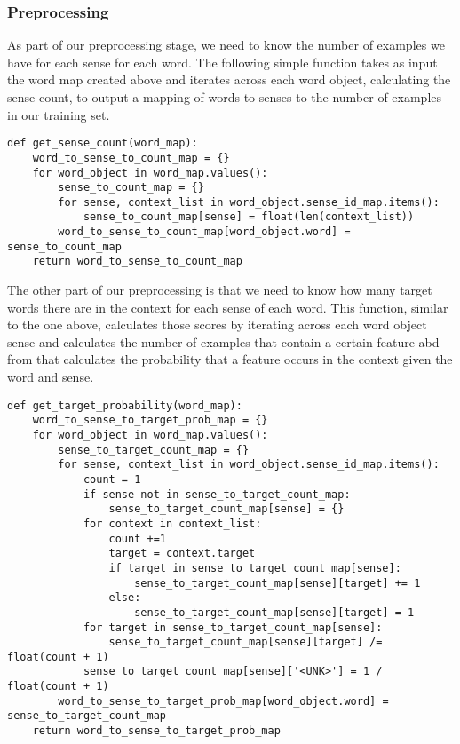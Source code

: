 \documentclass[11pt]{article}
\begin{document}
\subsubsection{Preprocessing}
As part of our preprocessing stage, we need to know the number of examples we have for each sense for each word. The following simple function takes as input the word map created above and iterates across each word object, calculating the sense count, to output a mapping of words to senses to the number of examples in our training set.

\begin{lstlisting}
def get_sense_count(word_map):
    word_to_sense_to_count_map = {}
    for word_object in word_map.values():
        sense_to_count_map = {}
        for sense, context_list in word_object.sense_id_map.items():
            sense_to_count_map[sense] = float(len(context_list))
        word_to_sense_to_count_map[word_object.word] = sense_to_count_map
    return word_to_sense_to_count_map
\end{lstlisting}

The other part of our preprocessing is that we need to know how many target words there are in the context for each sense of each word. This function, similar to the one above, calculates those scores by iterating across each word object sense and calculates the number of examples that contain a certain feature abd from that calculates the probability that a feature occurs in the context given the word and sense.

\begin{lstlisting}
def get_target_probability(word_map):
    word_to_sense_to_target_prob_map = {}
    for word_object in word_map.values():
        sense_to_target_count_map = {}
        for sense, context_list in word_object.sense_id_map.items():
            count = 1
            if sense not in sense_to_target_count_map:
                sense_to_target_count_map[sense] = {}
            for context in context_list:
                count +=1
                target = context.target
                if target in sense_to_target_count_map[sense]:
                    sense_to_target_count_map[sense][target] += 1
                else:
                    sense_to_target_count_map[sense][target] = 1
            for target in sense_to_target_count_map[sense]:
                sense_to_target_count_map[sense][target] /= float(count + 1)
            sense_to_target_count_map[sense]['<UNK>'] = 1 / float(count + 1)
        word_to_sense_to_target_prob_map[word_object.word] = sense_to_target_count_map
    return word_to_sense_to_target_prob_map
\end{lstlisting}
\end{document}
